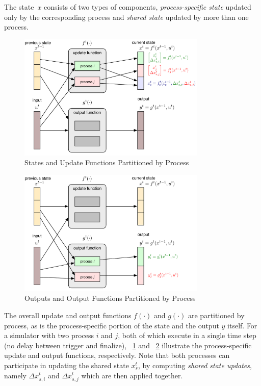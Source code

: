 \documentclass[12pt]{article}
\numberwithin{equation}{section}
\numberwithin{table}{section}
\numberwithin{figure}{section}
\begin{document}
The state~$x$ consists of two types of components, \emph{process-specific state} updated only by the corresponding process and \emph{shared state} updated by more than one process.

\begin{figure}[hbtp]
  \centering
  \includegraphics[width=0.8\textwidth]{figures/simulator-update-diagram-5}
  \caption{States and Update Functions Partitioned by Process}
  \label{fig:update5}
\end{figure}

\begin{figure}[hbtp]
  \centering
  \includegraphics[width=0.8\textwidth]{figures/simulator-update-diagram-7}
  \caption{Outputs and Output Functions Partitioned by Process}
  \label{fig:update7}
\end{figure}

The overall update and output functions $f(\cdot)$ and $g(\cdot)$ are partitioned by process, as is the process-specific portion of the state and the output $y$ itself. For a simulator with two process $i$ and $j$, both of which execute in a single time step (no delay between trigger and finalize), \figurename~\ref{fig:update5} and \figurename~\ref{fig:update7} illustrate the process-specific update and output functions, respectively. Note that both processes can participate in updating the shared state $x_s^t$, by computing \emph{shared state updates}, namely $\Delta x_{s,i}^t$ and $\Delta x_{s,j}^t$ which are then applied together.
\end{document}
